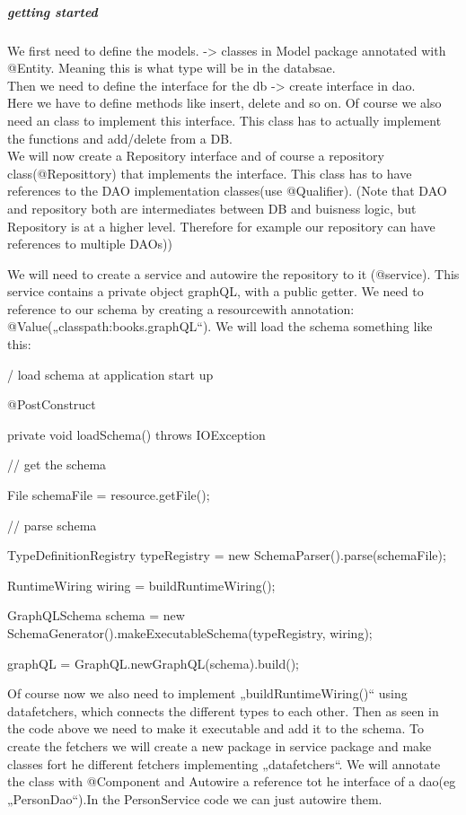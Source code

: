 \begin{itemize}
        \subparagraph{getting started}
        We first need to define the models. -> classes in Model package annotated with @Entity. Meaning this is what type will be in the databsae.\\
        Then we need to define the interface for the db -> create interface in dao.\\
        Here we have to define methods like insert, delete and so on. Of course we also need an class to implement this interface. This class has to actually implement the functions and add/delete from a DB.\\
        We will now create a Repository interface and of course a repository class(@Reposittory) that implements the interface. This class has to have references to the 
        DAO implementation classes(use @Qualifier). (Note that DAO and repository both are intermediates between DB and buisness logic, but Repository is at a higher level.
        Therefore for example our repository can have references to multiple DAOs))

        We will need to create a service and autowire the repository to it (@service). This service contains a private object graphQL, with a public getter. 
        We need to reference to our schema by creating a resourcewith annotation: @Value(„classpath:books.graphQL“). We will load the schema something like this:


        / load schema at application start up
        
        @PostConstruct
        
        private void loadSchema() throws IOException {        
        
        // get the schema
        
        File schemaFile = resource.getFile();
        
        // parse schema
        
        TypeDefinitionRegistry typeRegistry = new SchemaParser().parse(schemaFile);
        
        RuntimeWiring wiring = buildRuntimeWiring();
        
        
        GraphQLSchema schema = new SchemaGenerator().makeExecutableSchema(typeRegistry, wiring);
        
        graphQL = GraphQL.newGraphQL(schema).build();
        
        }
        Of course now we also need to implement „buildRuntimeWiring()“ using datafetchers, which connects the different types to each other.
        Then as seen in the code above we need to make it executable and add it to the schema.
        To create the fetchers we will create a new package in service package and make classes fort he different fetchers implementing „datafetchers“.
        We will annotate the class with @Component and Autowire a reference tot he interface of a dao(eg „PersonDao“).In the PersonService code we can just autowire them.
        

\end{itemize}
